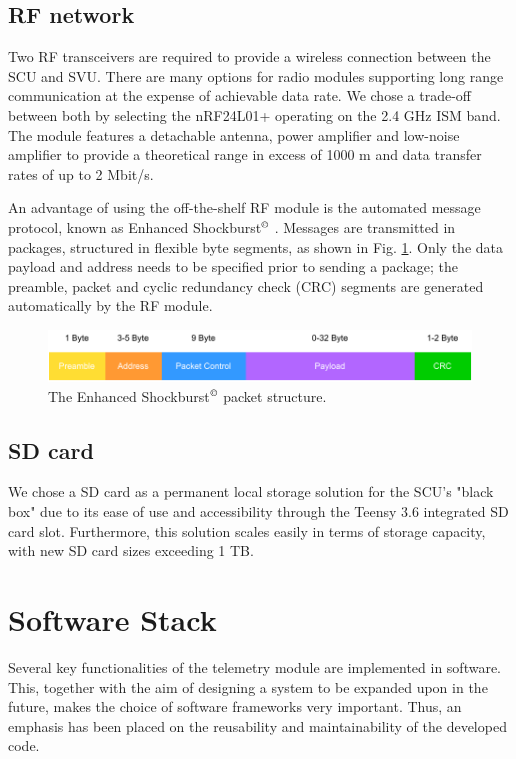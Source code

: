\documentclass[a4paper,conference]{IEEEtran}
\begin{document}
\subsection{RF network} %
Two RF transceivers are required to provide a wireless connection between the SCU and SVU. There are many options for radio modules supporting long range communication at the expense of achievable data rate. We chose a trade-off between both by selecting the nRF24L01+ operating on the 2.4 GHz ISM band. The module features a detachable antenna, power amplifier and low-noise amplifier to provide a theoretical range in excess of 1000 m and data transfer rates of up to 2 Mbit/s.

An advantage of using the off-the-shelf RF module is the automated message protocol, known as Enhanced Shockburst$^\copyright$ \cite{shockburst}. Messages are transmitted in packages, structured in flexible byte segments, as shown in Fig. \ref{fig:shockburst}. Only the data payload and address needs to be specified prior to sending a package; the preamble, packet and cyclic redundancy check (CRC) segments are generated automatically by the RF module.

\begin{figure}[h]
    \centering
    \includegraphics[width=\linewidth]{documentation/images/EnhancedShockburst.pdf}
    \caption{The Enhanced Shockburst$^\copyright$ packet structure.}
    \label{fig:shockburst}
\end{figure}

\subsection{SD card}

We chose a SD card as a permanent local storage solution for the SCU's "black box" due to its ease of use and accessibility through the Teensy 3.6 integrated SD card slot. Furthermore, this solution scales easily in terms of storage capacity, with new SD card sizes exceeding 1 TB.

\section{Software Stack}

Several key functionalities of the telemetry module are implemented in software. This, together with the aim of designing a system to be expanded upon in the future, makes the choice of software frameworks very important. Thus, an emphasis has been placed on the reusability and maintainability of the developed code.
\end{document}
